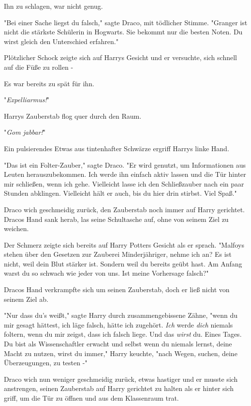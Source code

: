 {Ihn zu schlagen, war nicht genug.

"Bei einer Sache liegst du falsch," sagte Draco, mit tödlicher Stimme. "Granger ist nicht die stärkste Schülerin in Hogwarts. Sie bekommt nur die besten Noten. Du wirst gleich den Unterschied erfahren."

Plötzlicher Schock zeigte sich auf Harrys Gesicht und er versuchte, sich schnell auf die Füße zu rollen -

Es war bereits zu spät für ihn.

"\emph{Expelliarmus!}"

Harrys Zauberstab flog quer durch den Raum.

"\emph{Gom jabbar!}"

Ein pulsierendes Etwas aus tintenhafter Schwärze ergriff Harrys linke Hand.

"Das ist ein Folter-Zauber," sagte Draco. "Er wird genutzt, um Informationen aus Leuten herauszubekommen. Ich werde ihn einfach aktiv lassen und die Tür hinter mir schließen, wenn ich gehe. Vielleicht lasse ich den Schließzauber nach ein paar Stunden abklingen. Vielleicht hält er auch, bis du hier drin stirbst. Viel Spaß."

Draco wich geschmeidig zurück, den Zauberstab noch immer auf Harry gerichtet. Dracos Hand sank herab, las seine Schultasche auf, ohne von seinem Ziel zu weichen.

Der Schmerz zeigte sich bereits auf Harry Potters Gesicht als er sprach. "Malfoys stehen über den Gesetzen zur Zauberei Minderjähriger, nehme ich an? Es ist nicht, weil dein Blut stärker ist. Sondern weil du bereits geübt hast. Am Anfang warst du so schwach wie jeder von uns. Ist meine Vorhersage falsch?"

Dracos Hand verkrampfte sich um seinen Zauberstab, doch er ließ nicht von seinem Ziel ab.

"Nur dass du's weißt," sagte Harry durch zusammengebissene Zähne, "wenn du mir gesagt hättest, ich läge falsch, hätte ich zugehört. \emph{Ich} werde \emph{dich} niemals foltern, wenn du mir zeigst, dass ich falsch liege. Und das \emph{wirst} du. Eines Tages. Du bist als Wissenschaftler erwacht und selbst wenn du niemals lernst, deine Macht zu nutzen, wirst du immer," Harry keuchte, "nach Wegen, suchen, deine Überzeugungen, zu testen -"

Draco wich nun weniger geschmeidig zurück, etwas hastiger und er musste sich anstrengen, seinen Zauberstab auf Harry gerichtet zu halten als er hinter sich griff, um die Tür zu öffnen und aus dem Klassenraum trat.

}
